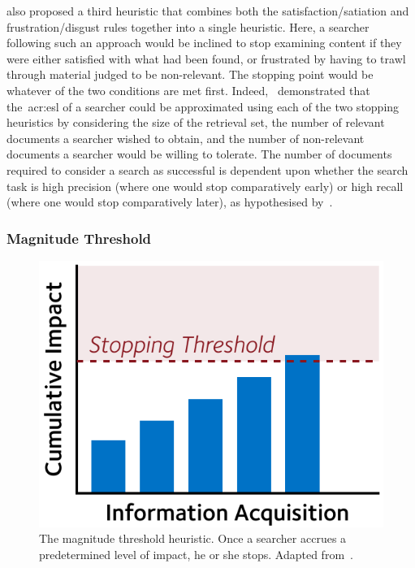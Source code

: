 \cite{kraft1979stopping_rules} also proposed a third heuristic that combines both the satisfaction/satiation and frustration/disgust rules together into a single heuristic. Here, a searcher following such an approach would be inclined to stop examining content if they were either satisfied with what had been found, or frustrated by having to trawl through material judged to be non-relevant. The stopping point would be whatever of the two conditions are met first. Indeed,~\cite{kraft1979stopping_rules} demonstrated that the~\gls{acr:esl} of a searcher could be approximated using each of the two stopping heuristics by considering the size of the retrieval set, the number of relevant documents a searcher wished to obtain, and the number of non-relevant documents a searcher would be willing to tolerate. The number of documents required to consider a search as successful is dependent upon whether the search task is high precision (where one would stop comparatively early) or high recall (where one would stop comparatively later), as hypothesised by~\cite{bates1984thirty_items}.

\subsubsection{Magnitude Threshold}\label{sec:stopping_background:heuristics:magnitude}
\begin{figure}
    \begin{center}
    \vspace*{-10mm}
    \includegraphics[width=1\textwidth]{figures/ch3-threshold.pdf}
    \end{center}
    \vspace*{-6mm}
    \caption[The magnitude threshold stopping heuristic]{The magnitude threshold heuristic. Once a searcher accrues a predetermined level of impact, he or she stops. Adapted from~\cite{browne2004stopping_rules}.}
    \label{fig:threshold}
\end{figure}

